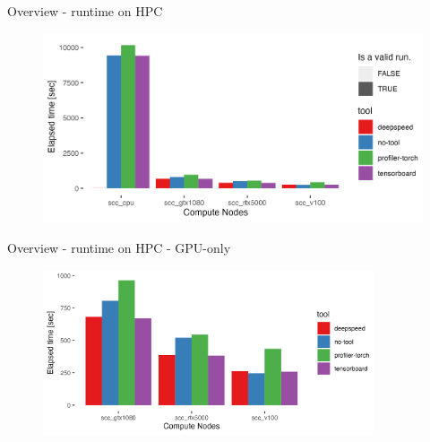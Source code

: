 \documentclass[compress,aspectratio=169]{beamer}
\begin{document}
\begin{frame}{Overview - runtime on HPC}
    \vspace{-1em}
    \begin{center}
    \begin{figure}
        \includegraphics[width=1\textwidth]{../../data/sacct_barplot_by_nodes_no-experiment}
    \end{figure}
    \end{center}
\end{frame}

\begin{frame}{Overview - runtime on HPC - GPU-only}
    \vspace{-1em}
    \begin{center}
    \begin{figure}
        \includegraphics[width=0.87\textwidth]{../../data/sacct_barplot_by_nodes_no-experiment_gpu}
    \end{figure}
    \end{center}
\end{frame}
\end{document}

